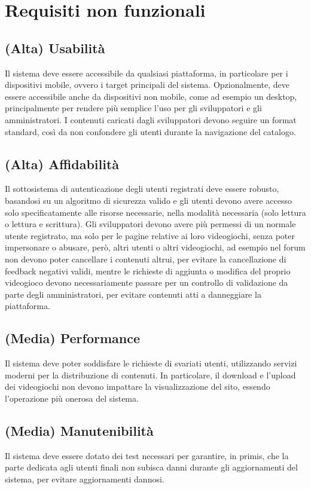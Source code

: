 \section{Requisiti non funzionali}
\subsection{(Alta) Usabilità}
Il sistema deve essere accessibile da qualsiasi piattaforma, in particolare per i dispositivi mobile, ovvero i target principali del sistema. Opzionalmente, deve essere accessibile anche da dispositivi non mobile, come ad esempio un desktop, principalmente per rendere più semplice l’uso per gli sviluppatori e gli amministratori. I contenuti caricati dagli sviluppatori devono seguire un format standard, così da non confondere gli utenti durante la navigazione del catalogo.

\subsection{(Alta) Affidabilità}
Il sottosistema di autenticazione degli utenti registrati deve essere robusto, basandosi su un algoritmo di sicurezza valido e gli utenti devono avere accesso solo specificatamente alle risorse necessarie, nella modalità necessaria (solo lettura o lettura e scrittura). Gli sviluppatori devono avere più permessi di un normale utente registrato, ma solo per le pagine relative ai loro videogiochi, senza poter impersonare o abusare, però, altri utenti o altri videogiochi, ad esempio nel forum non devono poter cancellare i contenuti altrui, per evitare la cancellazione di feedback negativi validi, mentre le richieste di aggiunta o modifica del proprio videogioco devono necessariamente passare per un controllo di validazione da parte degli amministratori, per evitare contenuti atti a danneggiare la piattaforma.

\subsection{(Media) Performance}
Il sistema deve poter soddisfare le richieste di svariati utenti, utilizzando servizi moderni per la distribuzione di contenuti. In particolare, il download e l’upload dei videogiochi non devono impattare la visualizzazione del sito, essendo l’operazione più onerosa del sistema.

\subsection{(Media) Manutenibilità}
Il sistema deve essere dotato dei test necessari per garantire, in primis, che la parte dedicata agli utenti finali non subisca danni durante gli aggiornamenti del sistema, per evitare aggiornamenti dannosi.

